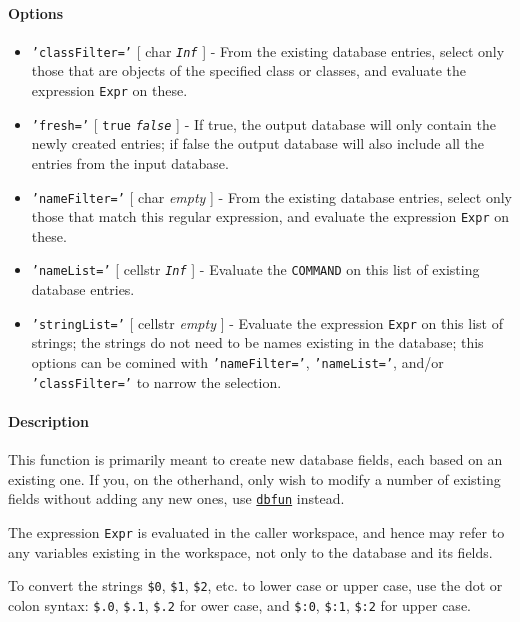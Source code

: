 \paragraph{Options}\label{options}

\begin{itemize}
\item
  \texttt{'classFilter='} {[} char \textbar{} \emph{\texttt{Inf}} {]} -
  From the existing database entries, select only those that are objects
  of the specified class or classes, and evaluate the expression
  \texttt{Expr} on these.
\item
  \texttt{'fresh='} {[} \texttt{true} \textbar{} \emph{\texttt{false}}
  {]} - If true, the output database will only contain the newly created
  entries; if false the output database will also include all the
  entries from the input database.
\item
  \texttt{'nameFilter='} {[} char \textbar{} \emph{empty} {]} - From the
  existing database entries, select only those that match this regular
  expression, and evaluate the expression \texttt{Expr} on these.
\item
  \texttt{'nameList='} {[} cellstr \textbar{} \emph{\texttt{Inf}} {]} -
  Evaluate the \texttt{COMMAND} on this list of existing database
  entries.
\item
  \texttt{'stringList='} {[} cellstr \textbar{} \emph{empty} {]} -
  Evaluate the expression \texttt{Expr} on this list of strings; the
  strings do not need to be names existing in the database; this options
  can be comined with \texttt{'nameFilter='}, \texttt{'nameList='},
  and/or \texttt{'classFilter='} to narrow the selection.
\end{itemize}

\paragraph{Description}\label{description}

This function is primarily meant to create new database fields, each
based on an existing one. If you, on the otherhand, only wish to modify
a number of existing fields without adding any new ones, use
\href{dbase/dbfun}{\texttt{dbfun}} instead.

The expression \texttt{Expr} is evaluated in the caller workspace, and
hence may refer to any variables existing in the workspace, not only to
the database and its fields.

To convert the strings \texttt{\$0}, \texttt{\$1}, \texttt{\$2}, etc. to
lower case or upper case, use the dot or colon syntax: \texttt{\$.0},
\texttt{\$.1}, \texttt{\$.2} for ower case, and \texttt{\$:0},
\texttt{\$:1}, \texttt{\$:2} for upper case.

